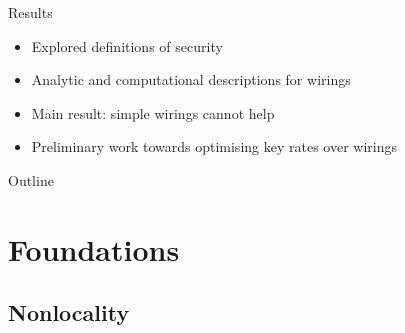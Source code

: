 \documentclass[xcolor=dvipsnames]{beamer}
\newcommand{\?}{\mathrel{?}} %
\begin{document}
\begin{frame}{Results}
  \begin{itemize}[<+->]
    \item Explored \alert{definitions of security}
    \item Analytic and computational \alert{descriptions for wirings}
    \item Main result: simple wirings \alert{cannot help}
    \item Preliminary work towards \alert{optimising key rates over wirings}
  \end{itemize}
\end{frame}

\begin{frame}{Outline}
  \tableofcontents
\end{frame}

\section{Foundations}

\subsection{Nonlocality}
\end{document}

